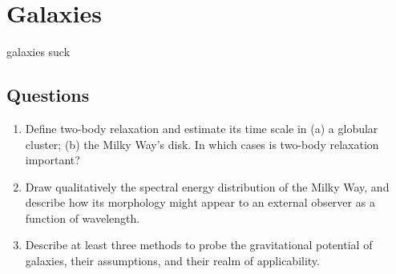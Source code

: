 \section{Galaxies}
galaxies suck
\subsection{Questions}
\begin{enumerate}
\item Define two-body relaxation and estimate its time scale in (a) a globular cluster; (b)
      the Milky Way's disk. In which cases is two-body relaxation important?
\item Draw qualitatively the spectral energy distribution of the Milky Way, and describe
      how its morphology might appear to an external observer as a function of wavelength.
\item Describe at least three methods to probe the gravitational potential of galaxies,
      their assumptions, and their realm of applicability.
\end{enumerate}
